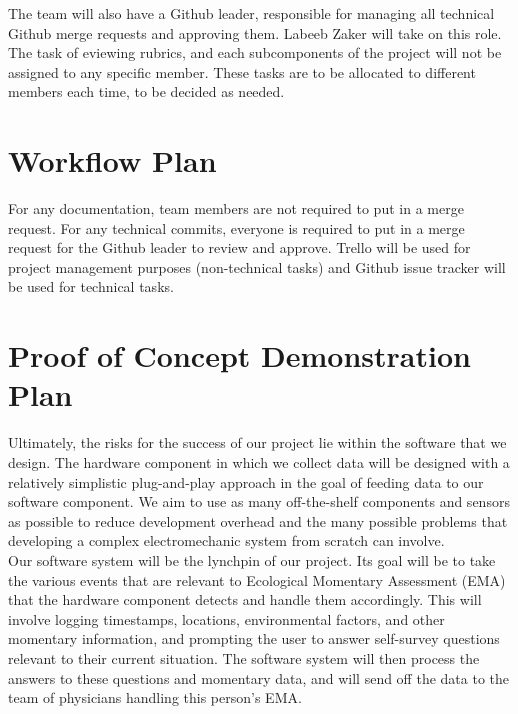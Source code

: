 \documentclass{article}
\begin{document}
The team will also have a Github leader, responsible for managing all technical Github merge requests and approving them. Labeeb Zaker will take on this role.\\

The task of eviewing rubrics, and each subcomponents of the project will not be assigned to any specific member. These tasks are to be allocated to different members each time, to be decided as needed.\\

\section{Workflow Plan}
For any documentation, team members are not required to put in a merge request. For any technical commits, everyone is required to put in a merge request for the Github leader to review and approve. Trello will be used for project management purposes (non-technical tasks) and Github issue tracker will be used for technical tasks.\\

\section{Proof of Concept Demonstration Plan}

Ultimately, the risks for the success of our project lie within the software that we design. The hardware component in which we collect data will be designed with a relatively simplistic plug-and-play approach in the goal of feeding data to our software component. We aim to use as many off-the-shelf components and sensors as possible to reduce development overhead and the many possible problems that developing a complex electromechanic system from scratch can involve.\\

Our software system will be the lynchpin of our project. Its goal will be to take the various events that are relevant to Ecological Momentary Assessment (EMA) that the hardware component detects and handle them accordingly. This will involve logging timestamps, locations, environmental factors, and other momentary information, and prompting the user to answer self-survey questions relevant to their current situation. The software system will then process the answers to these questions and momentary data, and will send off the data to the team of physicians handling this person's EMA.\\
\end{document}
